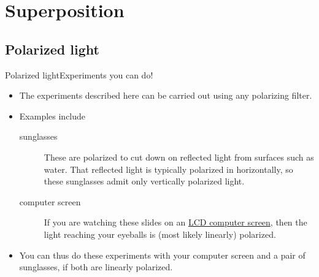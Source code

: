 
\section{Superposition}

\subsection{Polarized light}
\begin{frame}{Polarized light}{Experiments you can do!}
\begin{itemize}
    \item The experiments described here can be carried out using any polarizing filter.
    \item Examples include
    \begin{description}
        \item[sunglasses] These are polarized to cut down on reflected light from surfaces such as water.  That reflected light is typically polarized in horizontally, so these sunglasses admit only vertically polarized light.
        \item[computer screen]  If you are watching these slides on an \href{https://en.wikipedia.org/wiki/Liquid-crystal_display}{LCD computer screen}, then the light reaching your eyeballs is (most likely linearly) polarized.
    \end{description}
    \item You can thus do these experiments with your computer screen and a pair of sunglasses, if both are linearly polarized.
\end{itemize}
\end{frame}

